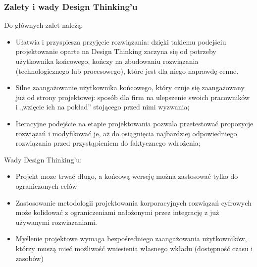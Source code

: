 \documentclass[a4paper,titleauthor]{mwart}
\begin{document}
 \subsubsection{Zalety i wady Design Thinking'u}
Do głównych zalet należą:\newline
\begin{itemize}
\item Ułatwia i przyspiesza przyjęcie rozwiązania: dzięki takiemu podejściu projektowanie oparte na Design Thinking zaczyna się od potrzeby użytkownika końcowego, kończy na zbudowaniu rozwiązania (technologicznego lub procesowego), które jest dla niego naprawdę cenne.
\item Silne zaangażowanie użytkownika końcowego, który czuje się zaangażowany już od strony projektowej: sposób dla firm na ulepszenie swoich pracowników i „wzięcie ich na pokład” stojącego przed nimi wyzwania;
\item Iteracyjne podejście na etapie projektowania pozwala przetestować propozycje rozwiązań i modyfikować je, aż do osiągnięcia najbardziej odpowiedniego rozwiązania przed przystąpieniem do faktycznego wdrożenia;
\end{itemize}
\vspace{0,5cm}
\hspace{0,5cm}Wady Design Thinking'u:\newline
\begin{itemize}
\item Projekt moze trwać długo, a końcową werseję można zastosować tylko do ograniczonych celów
	\item Zastosowanie metodologii projektowania korporacyjnych rozwiązań cyfrowych może kolidować z ograniczeniami nałożonymi przez integrację z już używanymi rozwiazaniami.
	\item Myślenie projektowe wymaga bezpośredniego zaangażowania użytkowników, którzy muszą mieć możliwość wniesienia własnego wkładu (dostępność czasu i zasobów)
\end{itemize}
 
\end{document}
